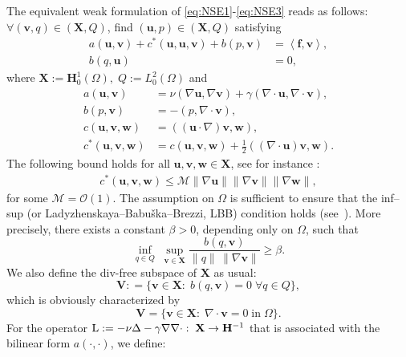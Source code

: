 \documentclass[3p]{elsarticle}
\def\V#1{\mathbf{#1}}
\newcommand{\divergence}{\mathrm{\nabla \cdot}}
\newcommand{\DY}[1]{{\color{black}{#1}}}
\begin{document}
The equivalent weak formulation of \eqref{eq:NSE1}-\eqref{eq:NSE3} reads as follows: $\forall (\V{v},q)\in(\V{X},Q) $,  find $(\V{u},p)\in (\V{X},Q)$ satisfying 
%
\begin{align}
a(\V{u}, \V{v})+c^*(\V{u},\V{u},\V{v})+b(p,\V{v}) & = \left<\V{f},\V{v} \right>, \label{eq:exact1}\\
b(q,\V{u}) & = 0, \label{eq:exact2}
\end{align}
where $\V{X}:= \V{H}_0^1(\Omega), \; Q:=L_0^2(\Omega)$ and 
%
\begin{align*}
a(\V{u}, \V{v}) & = \nu(\nabla \V{u}, \nabla \V{v}) + \gamma (\nabla \cdot \V{u}, \nabla \cdot \V{v}), \\
b(p, \V{v}) & = -(p,\nabla\cdot \V{v}), \\
c(\V{u},\V{v},\V{w}) &= ((\V{u}\cdot \nabla)\V{v},\V{w}), \\
c^* (\V{u},\V{v},\V{w}) &= c(\V{u},\V{v},\V{w})+\frac{1}{2}\left({(\nabla \cdot \V{u})}\V{v}, \V{w} \right).
\end{align*}
The following bound holds for all $\V{u},\V{v},\V{w} \in \V{X}$, see 
for instance
\cite{GirRav1986,Tem1979}:
\begin{eqnarray}
c^*(\V{u},\V{v},\V{w})\leq \mathcal{M} \|\nabla \V{u}\|\|\nabla \V{v}\|\|\nabla \V{w}\|, \label{eq:nnl}
\end{eqnarray}
for some $\mathcal{M}=\mathcal{O}(1)$. 
The assumption on $\Omega$ is sufficient to ensure that the inf--sup (or Ladyzhenskaya--Babu\v{s}ka--Brezzi, LBB) condition holds (see~\cite{BofBreFor2013,BoyFab2013,GirRav1986}). More precisely, there exists a constant $\beta > 0$, depending only on $\Omega$, such that
\begin{equation*}
\inf_{q \in Q} \;
\sup_{\V{v} \in \V{X}}
\frac{b(q,\V{v})}{\|q\|\, \|\nabla \V{v}\|}
\geq \beta.
\end{equation*} 
We also define the div-free subspace of $\V{X}$ as usual:
\begin{equation*}
    \V{V}: = \{ \V{v} \in \V{X}:\;  b(q,\V{v})=0 \; \forall q\in Q\},
\end{equation*}
which is obviously characterized by
\begin{equation*}
    \V{V} = \{ \V{v} \in \V{X}:\; \nabla \cdot  \V{v}=0 \; \text{in} \; \Omega\}.
\end{equation*}
For the operator\; ${\rm L}:= -\nu \Delta - \gamma \nabla \divergence:\; \V{X}\rightarrow \V{H}^{-1} $ that is associated with the bilinear form $a(\cdot,\cdot)$, we define:
\end{document}
